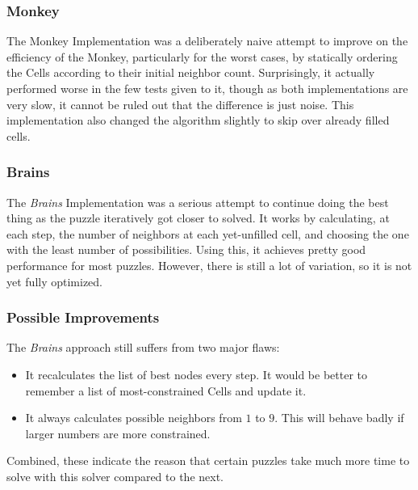 \documentclass[letterpaper]{article}
\begin{document}
\subsubsection{Monkey}
The Monkey Implementation was a deliberately naive attempt to improve on the efficiency of the Monkey, particularly for the worst cases, by statically ordering the Cells according to their initial neighbor count. Surprisingly, it actually performed worse in the few tests given to it, though as both implementations are very slow, it cannot be ruled out that the difference is just noise. This implementation also changed the algorithm slightly to skip over already filled cells.

\subsubsection{Brains}
The \emph{Brains} Implementation was a serious attempt to continue doing the best thing as the puzzle iteratively got closer to solved. It works by calculating, at each step, the number of neighbors at each yet-unfilled cell, and choosing the one with the least number of possibilities. Using this, it achieves pretty good performance for most puzzles. However, there is still a lot of variation, so it is not yet fully optimized.

\subsubsection{Possible Improvements}
The \emph{Brains} approach still suffers from two major flaws:
\begin{itemize}
\item It recalculates the list of best nodes every step. It would be better to remember a list of most-constrained Cells and update it.
\item It always calculates possible neighbors from $ 1 $ to $ 9 $. This will behave badly if larger numbers are more constrained.
\end{itemize}
Combined, these indicate the reason that certain puzzles take much more time to solve with this solver compared to the next.
\end{document}
